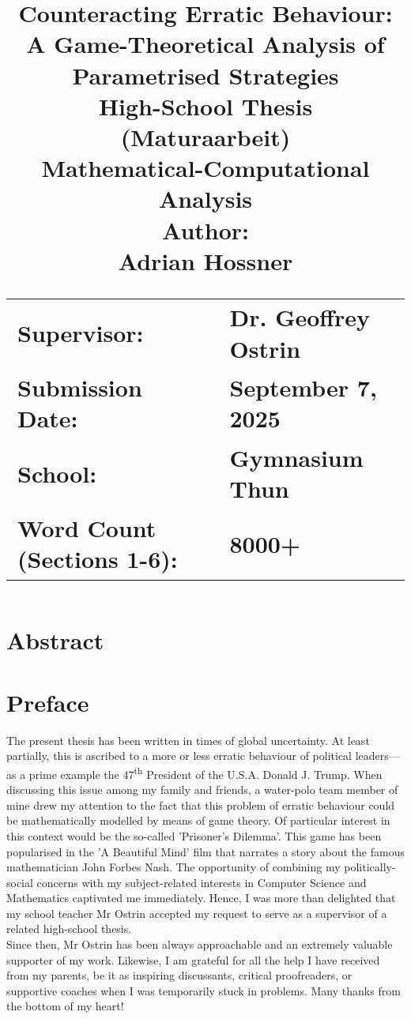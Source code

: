 \documentclass[11pt]{article}
\title{
	\textbf{Counteracting Erratic Behaviour:}\\
	\textbf{A Game-Theoretical Analysis of Parametrised Strategies}\\[\dvdist ex]
	\Large{High-School Thesis}\\
	\Large{(Maturaarbeit)}\\[\vdist ex]
	\Large{Mathematical-Computational}\\
	\Large{Analysis}\\[\vdist ex]
	\Large{Author:}\\
	\Large{Adrian Hossner}\\[3\vdist ex]
	\begin{flushleft}
		\begin{tabular}{>{\raggedright\arraybackslash}p{6cm} >{\raggedright\arraybackslash}p{5cm}}
			\Large{Supervisor: } & \Large{Dr. Geoffrey Ostrin}\\[\vdist ex]
			\Large{Submission Date: } & \Large{September 7, 2025}\\[\vdist ex]
			\Large{School: } & \Large{Gymnasium Thun}\\[\vdist ex]
			\Large{Word Count (Sections 1-6): } & \Large{8000+}\\[\vdist ex]
		\end{tabular}
	\end{flushleft}
}
\date{ } %
\begin{document}
\sloppy

\maketitle
{}

\newpage
{}

\section*{Abstract}


\newpage

\section*{Preface}
The present thesis has been written in times of global uncertainty.
At least partially, this is ascribed to a more or less erratic behaviour of political leaders---as a prime example the 47\textsuperscript{th} President of the U.S.A. Donald J. Trump.
When discussing this issue among my family and friends, a water-polo team member of mine drew my attention to the fact that this problem of erratic behaviour could be mathematically modelled by means of game theory.
Of particular interest in this context would be the so-called 'Prisoner's Dilemma'.
This game has been popularised in the 'A Beautiful Mind' film that narrates a story about the famous mathematician John Forbes Nash.
The opportunity of combining my politically-social concerns with my subject-related interests in Computer Science and Mathematics captivated me immediately.
Hence, I was more than delighted that my school teacher Mr Ostrin accepted my request to serve as a supervisor of a related high-school thesis.\\
\indent Since then, Mr Ostrin has been always approachable and an extremely valuable supporter of my work.
Likewise, I am grateful for all the help I have received from my parents, be it as inspiring discussants, critical proofreaders, or supportive coaches when I was temporarily stuck in problems. Many thanks from the bottom of my heart!


\newpage

\tableofcontents
\newpage
\end{document}
